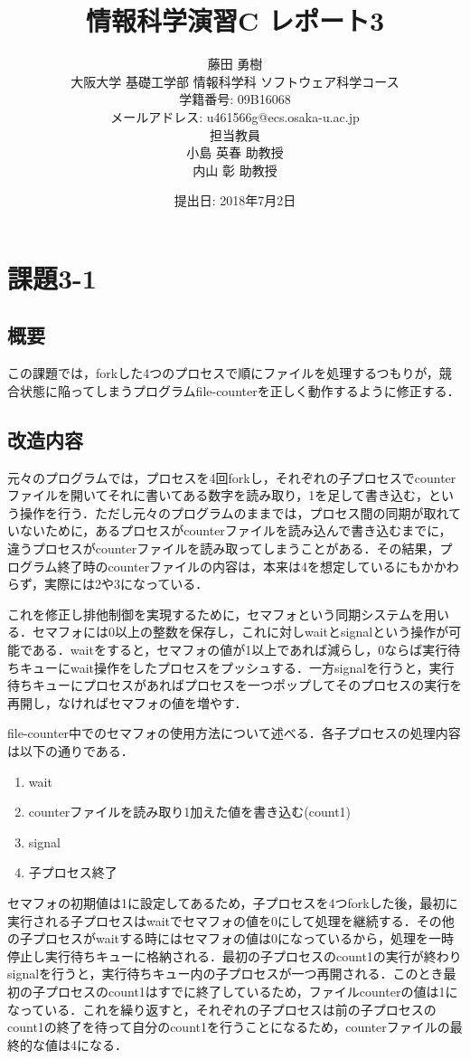 \documentclass[a4j,10pt,titlepage]{jsarticle}
\title{情報科学演習C レポート3}
\author{藤田 勇樹 \\
大阪大学 基礎工学部 情報科学科 ソフトウェア科学コース\\
学籍番号: 09B16068 \\
メールアドレス: u461566g@ecs.osaka-u.ac.jp \\
担当教員\\
小島 英春 助教授 \\
内山 彰 助教授}
\date{提出日: 2018年7月2日}
\begin{document}
\maketitle
\section{課題3-1}
\subsection{概要}
この課題では，forkした4つのプロセスで順にファイルを処理するつもりが，競合状態に陥ってしまうプログラムfile-counterを正しく動作するように修正する．

\subsection{改造内容}
元々のプログラムでは，プロセスを4回forkし，それぞれの子プロセスでcounterファイルを開いてそれに書いてある数字を読み取り，1を足して書き込む，という操作を行う．ただし元々のプログラムのままでは，プロセス間の同期が取れていないために，あるプロセスがcounterファイルを読み込んで書き込むまでに，違うプロセスがcounterファイルを読み取ってしまうことがある．その結果，プログラム終了時のcounterファイルの内容は，本来は4を想定しているにもかかわらず，実際には2や3になっている．

これを修正し排他制御を実現するために，セマフォという同期システムを用いる．セマフォには0以上の整数を保存し，これに対しwaitとsignalという操作が可能である．waitをすると，セマフォの値が1以上であれば減らし，0ならば実行待ちキューにwait操作をしたプロセスをプッシュする．一方signalを行うと，実行待ちキューにプロセスがあればプロセスを一つポップしてそのプロセスの実行を再開し，なければセマフォの値を増やす．

file-counter中でのセマフォの使用方法について述べる．各子プロセスの処理内容は以下の通りである．
\begin{enumerate}
  \item wait
  \item counterファイルを読み取り1加えた値を書き込む(count1)
  \item signal
  \item 子プロセス終了
\end{enumerate}

セマフォの初期値は1に設定してあるため，子プロセスを4つforkした後，最初に実行される子プロセスはwaitでセマフォの値を0にして処理を継続する．その他の子プロセスがwaitする時にはセマフォの値は0になっているから，処理を一時停止し実行待ちキューに格納される．最初の子プロセスのcount1の実行が終わりsignalを行うと，実行待ちキュー内の子プロセスが一つ再開される．このとき最初の子プロセスのcount1はすでに終了しているため，ファイルcounterの値は1になっている．これを繰り返すと，それぞれの子プロセスは前の子プロセスのcount1の終了を待って自分のcount1を行うことになるため，counterファイルの最終的な値は4になる．
\end{document}
